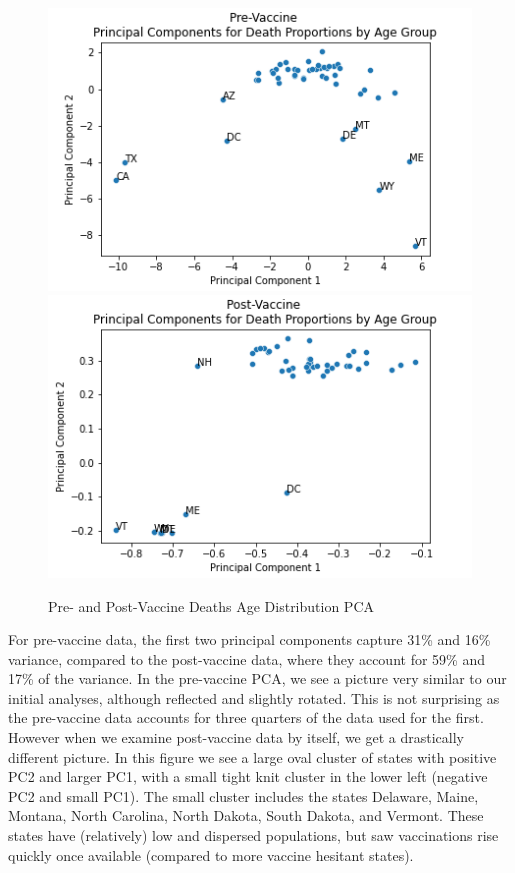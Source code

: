 \documentclass[11pt]{article}
\begin{document}
\begin{figure}[h]
\centering
\includegraphics[scale=0.45]{"../figures/pre_vaccine_death_pca.png"}
%
\includegraphics[scale=0.45]{"../figures/post_vaccine_death_pca.png"}
\caption{Pre- and Post-Vaccine Deaths Age Distribution PCA}
\end{figure}

For pre-vaccine data, the first two principal components capture 31\% and 16\% variance, compared to the post-vaccine data, where they account for 59\% and 17\% of the variance. In the pre-vaccine PCA, we see a picture very similar to our initial analyses, although reflected and slightly rotated. This is not surprising as the pre-vaccine data accounts for three quarters of the data used for the first. However when we examine post-vaccine data by itself, we get a drastically different picture. In this figure we see a large oval cluster of states with positive PC2 and larger PC1, with a small tight knit cluster in the lower left (negative PC2 and small PC1). The small cluster includes the states Delaware, Maine, Montana, North Carolina, North Dakota, South Dakota, and Vermont. These states have (relatively) low and dispersed populations, but saw vaccinations rise quickly once available (compared to more vaccine hesitant states). 






\end{document}
